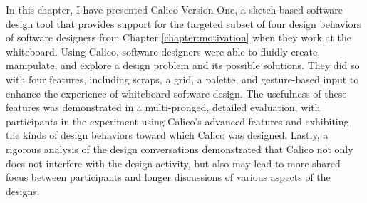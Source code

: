 In this chapter, I have presented Calico Version One, a sketch-based software design tool that provides support for the targeted subset of four design behaviors of software designers from Chapter \ref{chapter:motivation} when they work at the whiteboard. Using Calico, software designers were able to fluidly create, manipulate, and explore a design problem and its possible solutions. They did so with four features, including scraps, a grid, a palette, and gesture-based input to enhance the experience of whiteboard software design. The usefulness of these features was demonstrated in a multi-pronged, detailed evaluation, with participants in the experiment using Calico's advanced features and exhibiting the kinds of design behaviors toward which Calico was designed. Lastly, a rigorous analysis of the design conversations demonstrated that Calico not only does not interfere with the design activity, but also may lead to more shared focus between participants and longer discussions of various aspects of the designs.

